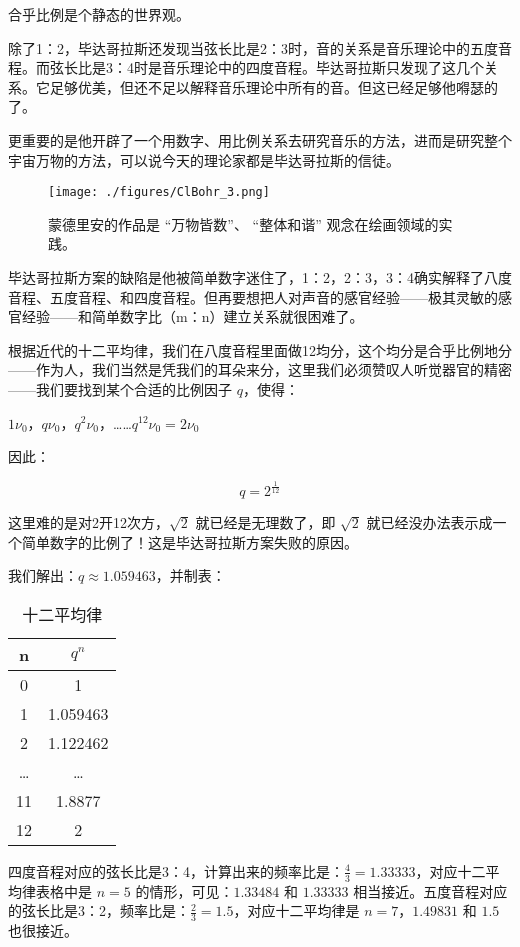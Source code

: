 合乎比例是个静态的世界观。

除了1：2，毕达哥拉斯还发现当弦长比是2：3时，音的关系是音乐理论中的五度音程。而弦长比是3：4时是音乐理论中的四度音程。毕达哥拉斯只发现了这几个关系。它足够优美，但还不足以解释音乐理论中所有的音。但这已经足够他嘚瑟的了。

更重要的是他开辟了一个用数字、用比例关系去研究音乐的方法，进而是研究整个宇宙万物的方法，可以说今天的理论家都是毕达哥拉斯的信徒。

\begin{figure}[ht]
\centering
\texttt{[image: ./figures/ClBohr\_3.png]}
\caption{蒙德里安的作品是 “万物皆数”、 “整体和谐” 观念在绘画领域的实践。} \label{ClBohr_fig3}
\end{figure}

毕达哥拉斯方案的缺陷是他被简单数字迷住了，1：2，2：3，3：4确实解释了八度音程、五度音程、和四度音程。但再要想把人对声音的感官经验——极其灵敏的感官经验——和简单数字比（m：n）建立关系就很困难了。

根据近代的十二平均律，我们在八度音程里面做12均分，这个均分是合乎比例地分——作为人，我们当然是凭我们的耳朵来分，这里我们必须赞叹人听觉器官的精密——我们要找到某个合适的比例因子 $q$，使得：

$1 \nu_0$，$q \nu_0$，$q^2 \nu_0$，……$q^{12} \nu_0 =2 \nu_0$

因此：

\begin{equation}
q = 2^{\frac{1}{12}}
\end{equation}

这里难的是对2开12次方，$\sqrt{2}$ 就已经是无理数了，即 $\sqrt{2}$ 就已经没办法表示成一个简单数字的比例了！这是毕达哥拉斯方案失败的原因。

我们解出：$q \approx 1.059463 $，并制表：

\begin{table}[ht]
\centering
\caption{⼗⼆平均律}\label{ClBohr_tab1}
\begin{tabular}{|c|c|}
\hline
n & $q^n$\\
\hline
0 & 1 \\
\hline
1& 1.059463 \\
\hline
2 & 1.122462 \\
\hline
… & … \\
\hline
11 & 1.8877 \\
\hline
12 & 2 \\
\hline
\end{tabular}
\end{table}


四度音程对应的弦长比是3：4，计算出来的频率比是：$\frac{4}{3} = 1.33333$，对应十二平均律表格中是 $n = 5$ 的情形，可见：$1.33484$ 和 $1.33333$ 相当接近。五度音程对应的弦长比是3：2，频率比是：$\frac{2}{3} = 1.5$，对应十二平均律是 $n=7$，$1.49831$ 和 $1.5$ 也很接近。

